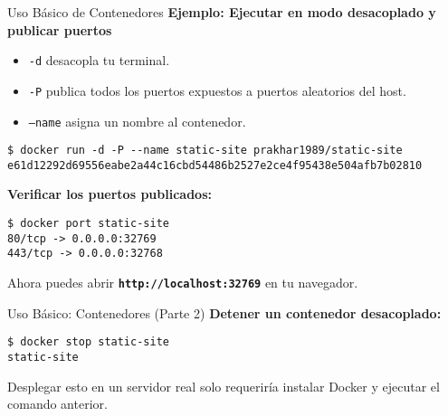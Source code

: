 \documentclass[aspectratio=169]{beamer} %
\begin{document}
\begin{frame}[containsverbatim]{Uso Básico de Contenedores}
    \textbf{Ejemplo: Ejecutar en modo \textbf{desacoplado} y publicar puertos}
    \begin{itemize}
        \item \texttt{-d} desacopla tu terminal.
        \item \texttt{-P} publica todos los puertos expuestos a puertos aleatorios del host.
        \item \texttt{--name} asigna un nombre al contenedor.
    \end{itemize}
    \begin{verbatim}
$ docker run -d -P --name static-site prakhar1989/static-site
e61d12292d69556eabe2a44c16cbd54486b2527e2ce4f95438e504afb7b02810
    \end{verbatim}
    \vspace{0.2cm}
    \textbf{Verificar los puertos publicados:}
    \begin{verbatim}
$ docker port static-site
80/tcp -> 0.0.0.0:32769
443/tcp -> 0.0.0.0:32768
    \end{verbatim}
    Ahora puedes abrir \textbf{\texttt{http://localhost:32769}} en tu navegador.
\end{frame}

\begin{frame}[containsverbatim]{Uso Básico: Contenedores (Parte 2)}
    \textbf{Detener un contenedor desacoplado:}
    \begin{verbatim}
$ docker stop static-site
static-site
    \end{verbatim}
    Desplegar esto en un servidor real solo requeriría instalar Docker y ejecutar el comando anterior.
\end{frame}
\end{document}
